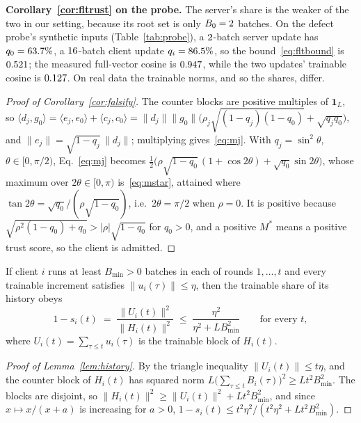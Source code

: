 \documentclass[journal]{IEEEtran}
\begin{document}
\textbf{Corollary~\ref{cor:fltrust} on the probe.} The server's share is the
weaker of the two in our setting, because its root set is only $B_0=2$
batches. On the defect probe's synthetic inputs (Table~\ref{tab:probe}), a $2$-batch server update
has $q_0=63.7\%$, a $16$-batch client update $q_i=86.5\%$, so
the bound~\eqref{eq:fltbound} is $0.521$; the measured full-vector cosine is
$0.947$, while the two updates' trainable cosine is $0.127$. On real
data the trainable norms, and so the shares, differ.
\par\smallskip
\begin{proof}[Proof of Corollary~\ref{cor:falsify}]
The counter blocks are positive multiples of $\mathbf{1}_L$, so
$\langle d_j,g_0\rangle=\langle e_j,e_0\rangle+\langle c_j,c_0\rangle
=\|d_j\|\|g_0\|\big(\rho_j\sqrt{(1-q_j)(1-q_0)}+\sqrt{q_jq_0}\big)$, and
$\|e_j\|=\sqrt{1-q_j}\,\|d_j\|$; multiplying gives~\eqref{eq:mj}. With
$q_j=\sin^2\theta$, $\theta\in[0,\pi/2)$, Eq.~\eqref{eq:mj} becomes
$\tfrac12\big(\rho\sqrt{1-q_0}\,(1+\cos2\theta)+\sqrt{q_0}\sin2\theta\big)$, whose
maximum over $2\theta\in[0,\pi)$ is~\eqref{eq:mstar}, attained where
$\tan2\theta=\sqrt{q_0}/(\rho\sqrt{1-q_0})$, i.e.\ $2\theta=\pi/2$ when $\rho=0$.
It is positive because $\sqrt{\rho^2(1-q_0)+q_0}>|\rho|\sqrt{1-q_0}$ for $q_0>0$,
and a positive $M^*$ means a positive trust score, so the client is admitted.
\end{proof}


\renewcommand{\thelemma}{S\arabic{lemma}}%
\begin{lemma}
\label{lem:history}
If client $i$ runs at least $B_{\min}>0$ batches in each of rounds $1,\dots,t$ and
every trainable increment satisfies $\|u_i(\tau)\|\le\eta$, then the trainable share
of its history obeys
\[
1-s_i(t)\;=\;\frac{\|U_i(t)\|^2}{\|H_i(t)\|^2}\;\le\;\frac{\eta^2}{\eta^2+LB_{\min}^2}
\qquad\text{for every }t,
\]
where $U_i(t)=\sum_{\tau\le t}u_i(\tau)$ is the trainable block of $H_i(t)$.
\end{lemma}

\begin{proof}[Proof of Lemma~\ref{lem:history}]
By the triangle inequality $\|U_i(t)\|\le t\eta$, and the counter block of $H_i(t)$
has squared norm $L\big(\sum_{\tau\le t}B_i(\tau)\big)^2\ge Lt^2B_{\min}^2$. The
blocks are disjoint, so $\|H_i(t)\|^2\ge\|U_i(t)\|^2+Lt^2B_{\min}^2$, and since
$x\mapsto x/(x+a)$ is increasing for $a>0$,
$1-s_i(t)\le t^2\eta^2/(t^2\eta^2+Lt^2B_{\min}^2)$.
\end{proof}
\end{document}
